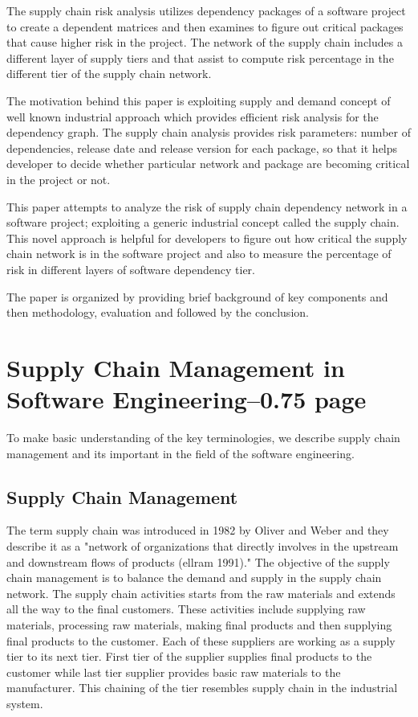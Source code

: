 \documentclass[10pt,conference]{IEEEtran}
\begin{document}
The supply chain risk analysis utilizes dependency packages of a software project to create a dependent matrices and then examines to figure out critical packages that cause higher risk in the project. The network of the supply chain includes a different layer of supply tiers and that assist to compute risk percentage in the different tier of the supply chain network.

The motivation behind this paper is exploiting supply and demand concept of well known industrial approach which provides efficient risk analysis for the dependency graph. The supply chain analysis provides risk parameters: number of dependencies, release date and release version for each package, so that it helps developer to decide whether particular network and package are becoming critical in the project or not. 

This paper attempts to analyze the risk of supply chain dependency network in a software project; exploiting a generic industrial concept called the supply chain. This novel approach is helpful for developers to figure out how critical the supply chain network is in the software project and also to measure the percentage of risk in different layers of software dependency tier.     

The paper is organized by providing brief background of key components and then methodology, evaluation and followed by the conclusion.

\section{Supply Chain Management in Software Engineering--0.75 page}
To make basic understanding of the key terminologies, we describe supply chain management and its important in the field of the software engineering.
\subsection{Supply Chain Management}
The term supply chain was introduced in 1982 by Oliver and Weber and they describe it as a "network of organizations that directly involves in the upstream and downstream flows of products\cite{} (ellram 1991)." The objective of the supply chain management is to balance the demand and supply in the supply chain network. The supply chain activities starts from the raw materials and extends all the way to the final customers. These activities include supplying raw materials, processing raw materials, making final products and then supplying final products to the customer. Each of these suppliers are working as a supply tier to its next tier. First tier of the supplier supplies final products to the customer while last tier supplier provides basic raw materials to the manufacturer. This chaining of the tier resembles supply chain in the industrial system.
\end{document}
